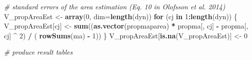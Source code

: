 \documentclass[a4paper, notitlepage, 12pt, krantz2]{krantz}
\newenvironment{Shaded}{\begin{snugshade}}{\end{snugshade}}
\newcommand{\CommentTok}[1]{\textcolor[rgb]{0.56,0.35,0.01}{\textit{#1}}}
\newcommand{\ControlFlowTok}[1]{\textcolor[rgb]{0.13,0.29,0.53}{\textbf{#1}}}
\newcommand{\DataTypeTok}[1]{\textcolor[rgb]{0.13,0.29,0.53}{#1}}
\newcommand{\DecValTok}[1]{\textcolor[rgb]{0.00,0.00,0.81}{#1}}
\newcommand{\KeywordTok}[1]{\textcolor[rgb]{0.13,0.29,0.53}{\textbf{#1}}}
\newcommand{\NormalTok}[1]{#1}
\newcommand{\OperatorTok}[1]{\textcolor[rgb]{0.81,0.36,0.00}{\textbf{#1}}}
\newcommand{\StringTok}[1]{\textcolor[rgb]{0.31,0.60,0.02}{#1}}
\begin{document}
\begin{Shaded}
\begin{Highlighting}[]
  \CommentTok{# standard errors of the area estimation (Eq. 10 in Olofsson et al. 2014)}
\NormalTok{  V_propAreaEst <-}\StringTok{ }\KeywordTok{array}\NormalTok{(}\DecValTok{0}\NormalTok{, }\DataTypeTok{dim=}\KeywordTok{length}\NormalTok{(dyn))}
  \ControlFlowTok{for}\NormalTok{ (cj }\ControlFlowTok{in} \DecValTok{1}\OperatorTok{:}\KeywordTok{length}\NormalTok{(dyn)) \{}
\NormalTok{    V_propAreaEst[cj] <-}\StringTok{ }\KeywordTok{sum}\NormalTok{((}\KeywordTok{as.vector}\NormalTok{(propmaparea) }\OperatorTok{*}\StringTok{ }\NormalTok{propma[, cj] }\OperatorTok{-}\StringTok{ }\NormalTok{propma[, cj] }\OperatorTok{^}\StringTok{ }\DecValTok{2}\NormalTok{) }\OperatorTok{/}\StringTok{ }\NormalTok{( }\KeywordTok{rowSums}\NormalTok{(ma) }\OperatorTok{-}\StringTok{ }\DecValTok{1}\NormalTok{))}
\NormalTok{  \}}
\NormalTok{  V_propAreaEst[}\KeywordTok{is.na}\NormalTok{(V_propAreaEst)] <-}\StringTok{ }\DecValTok{0}
  
  \CommentTok{# produce result tables}
  

\end{Highlighting}
\end{Shaded}
\end{document}
